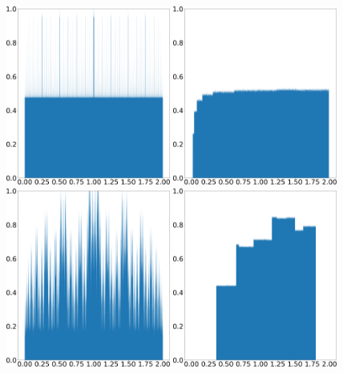 \begin{figure}
    \centering
    \includegraphics[width=0.48\textwidth]{tent_squashed_shadow_density_0.01.png}
    \hspace{0.02\textwidth}
    \includegraphics[width=0.48\textwidth]{tent_squashed_physical_density_0.01.png}
    \\ \vspace{0.02\textwidth}
    \includegraphics[width=0.48\textwidth]{tent_squashed_shadow_density_0.2.png}
    \hspace{0.02\textwidth}
    \includegraphics[width=0.48\textwidth]{tent_squashed_physical_density_0.2.png}

\end{figure}
